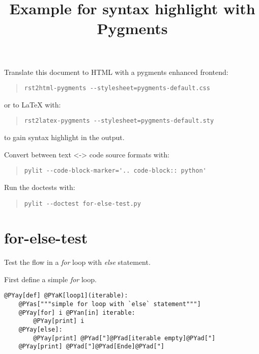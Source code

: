 \documentclass[10pt,a4paper,english]{scrartcl}
\title{Example for syntax highlight with Pygments}
\author{}
\date{}
\newlength{\locallinewidth}
\newcommand{\titlereference}[1]{\textsl{#1}}
\begin{document}
\maketitle

\setlength{\locallinewidth}{\linewidth}

Translate this document to HTML with a pygments enhanced frontend:
\begin{quote}\begin{verbatim}
rst2html-pygments --stylesheet=pygments-default.css
\end{verbatim}
\end{quote}

or to LaTeX with:
\begin{quote}\begin{verbatim}
rst2latex-pygments --stylesheet=pygments-default.sty
\end{verbatim}
\end{quote}

to gain syntax highlight in the output.

Convert between text {\textless}-{\textgreater} code source formats with:
\begin{quote}\begin{verbatim}
pylit --code-block-marker='.. code-block:: python'
\end{verbatim}
\end{quote}

Run the doctests with:
\begin{quote}\begin{verbatim}
pylit --doctest for-else-test.py
\end{verbatim}
\end{quote}



\hypertarget{for-else-test}{}
\section*{for-else-test}
\label{for-else-test}

Test the flow in a \titlereference{for} loop with \titlereference{else} statement.

First define a simple \titlereference{for} loop.
\begin{Verbatim}[commandchars=@\[\]]
@PYay[def] @PYaK[loop1](iterable):
    @PYas["""simple for loop with `else` statement"""]
    @PYay[for] i @PYan[in] iterable:
        @PYay[print] i
    @PYay[else]:
        @PYay[print] @PYad["]@PYad[iterable empty]@PYad["]
    @PYay[print] @PYad["]@PYad[Ende]@PYad["]
\end{Verbatim}
\end{document}
